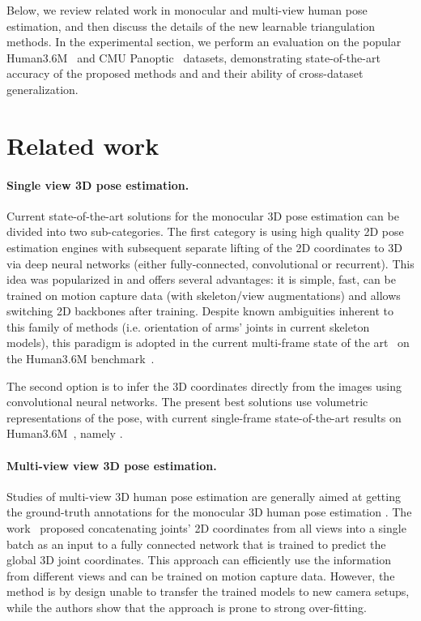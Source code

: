 \documentclass[10pt,twocolumn,letterpaper]{article}
\begin{document}
Below, we review related work in monocular and multi-view human pose estimation, and then discuss the details of the new learnable triangulation methods. In the experimental section, we perform an evaluation on the popular Human3.6M~\cite{h36m_pami} and CMU Panoptic~\cite{Joo_2017_TPAMI} datasets, demonstrating state-of-the-art accuracy of the proposed methods and and their ability of cross-dataset generalization.








 \section{Related work}
\label{sect:related}

\paragraph{Single view 3D pose estimation.}
Current state-of-the-art solutions for the monocular 3D pose estimation can be divided into two sub-categories. The first category is using high quality 2D pose estimation engines with subsequent separate lifting of the 2D coordinates to 3D via deep neural networks (either fully-connected, convolutional or recurrent). This idea was popularized in \cite{martinez2017simple} and offers several advantages: it is simple, fast, can be trained on motion capture data (with skeleton/view augmentations) and allows switching 2D backbones after training. Despite known ambiguities inherent to this family of methods (i.e. orientation of arms' joints in current skeleton models), this paradigm is adopted in the current multi-frame state of the art~\cite{pavllo:videopose3d:2018} on the Human3.6M benchmark~\cite{h36m_pami}.

The second option is to infer the 3D coordinates directly from the images using convolutional neural networks. The present best solutions use volumetric representations of the pose, with current single-frame state-of-the-art results on Human3.6M~\cite{h36m_pami}, namely \cite{sun2018integral}. 

\paragraph{Multi-view view 3D pose estimation.} Studies of multi-view 3D human pose estimation are generally aimed at getting the ground-truth annotations for the monocular 3D human pose estimation \cite{Rhodin2018, Joo_2017_TPAMI}. The work~\cite{Kadkhodamohammadi2018} proposed concatenating joints' 2D coordinates from all views into a single batch as an input to a fully connected network that is trained to predict the global 3D joint coordinates. This approach can efficiently use the information from different views and can be trained on motion capture data. However, the method is by design unable to transfer the trained models to new camera setups, while the authors show that the approach is prone to strong over-fitting.
\end{document}
